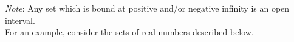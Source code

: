 
%
%

\textit{Note}: Any set which is bound at positive and/or negative infinity is an open interval.\\

For an example, consider the sets of real numbers described below.

